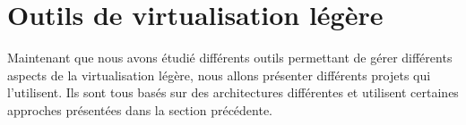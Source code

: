 \section{Outils de virtualisation légère}
\label{section:sota}

Maintenant que nous avons étudié différents outils permettant de gérer différents aspects de la virtualisation légère, nous allons présenter différents projets qui l'utilisent. Ils sont tous basés sur des architectures différentes et utilisent certaines approches présentées dans la section précédente.

